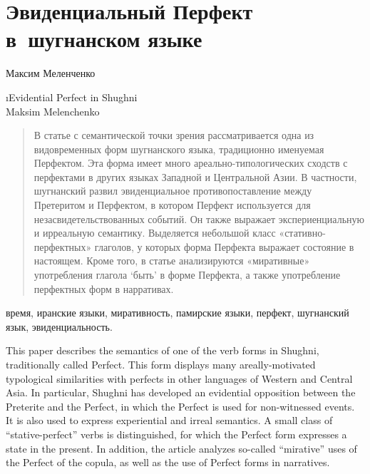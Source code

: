 \chapter*{Эвиденциальный Перфект в~шугнанском языке}
\setcounter{section}{0}
\label{chapter-melen-evid}

\begin{customauthorname}
Максим Меленченко
\end{customauthorname}

\begin{englishtitle}
\i{Evidential Perfect in Shughni\\{\small Maksim Melenchenko}}
\end{englishtitle}

\begin{abstract}
В статье с семантической точки зрения рассматривается одна из видовременных форм шугнанского языка, традиционно именуемая Перфектом. Эта форма имеет много ареально-типологических сходств с перфектами в других языках Западной и Центральной Азии. В частности, шугнанский развил эвиденциальное противопоставление между Претеритом и Перфектом, в котором Перфект используется для незасвидетельствованных событий. Он также выражает экспериенциальную и ирреальную семантику. Выделяется небольшой класс «стативно-перфектных» глаголов, у которых форма Перфекта выражает состояние в настоящем. Кроме того, в статье анализируются «миративные» употребления глагола ‘быть’ в форме Перфекта, а также употребление перфектных форм в нарративах.
\end{abstract}

\begin{keywords}
время, иранские языки, миративность, памирские языки, перфект, шугнанский язык, эвиденциальность.
\end{keywords}

\begin{eng-abstract}
This paper describes the semantics of one of the verb forms in Shughni, traditionally called Perfect. This form displays many areally-motivated typological similarities with perfects in other languages of Western and Central Asia. In particular, Shughni has developed an evidential opposition between the Preterite and the Perfect, in which the Perfect is used for non-witnessed events. It is also used to express experiential and irreal semantics. A small class of “stative-perfect” verbs is distinguished, for which the Perfect form expresses a state in the present. In addition, the article analyzes so-called “mirative” uses of the Perfect of the copula, as well as the use of Perfect forms in narratives.
\end{eng-abstract}

